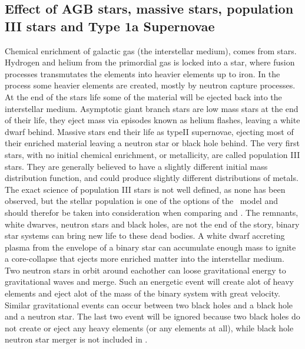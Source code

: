 \FloatBarrier
\subsection{Effect of AGB stars, massive stars, population III stars and Type 1a Supernovae}
\iffalse
set_star_plot_pop3_bound_iron.png
set_star_plot_pop3_bound_oxy.png
set_star_plot_pop3_yt_iron.png
set_star_plot_pop3_yt_oxy.png
set_star_plot_transmass.png
\fi
\iffalse
set_sn1a_plot_sn1a_dtd1_iron.png         
set_sn1a_plot_sn1a_dtd1_oxy.png          
set_sn1a_plot_sn1a_dtd2_iron.png         
set_sn1a_plot_sn1a_dtd2_oxy.png
set_sn1a_plot_sn1a_dtd3_iron.png
set_sn1a_plot_sn1a_dtd3_oxy.png
set_sn1a_plot_sn1a_num1_iron.png
set_sn1a_plot_sn1a_num1_oxy.png
set_sn1a_plot_sn1a_num2_iron.png
set_sn1a_plot_sn1a_num2_oxy.png
set_sn1a_plot_sn1a_yt.png
\fi


Chemical enrichment of galactic gas (the interstellar medium), comes from stars.
 Hydrogen and helium from the primordial gas is locked into a star, where fusion processes transmutates the elements into heavier elements up to iron. In the process some heavier elements are created, mostly by neutron capture processes. At the end of the stars life some of the material will be ejected back into the interstellar medium.
Asymptotic giant branch stars are low mass stars at the end of their life, they eject mass via episodes known as helium flashes, leaving a white dwarf behind.
Massive stars end their life as typeII supernovae, ejecting most of their enriched material leaving a neutron star or black hole behind.
The very first stars, with no initial chemical enrichment, or metallicity, are called population III stars. They are generally believed to have a slightly different initial mass distribution function, and could produce slightly different distributions of metals.
The exact science of population III stars is not well defined, as none has been observed, but the stellar population is one of the options of the \omegamodel\ model and should therefor be taken into consideration when comparing \eris and \omegamodel.
The remnants, white dwarves, neutron stars and black holes, are not the end of the story, binary star systems can bring new life to these dead bodies. A white dwarf accreting plasma from the envelope of a binary star can accumulate enough mass to ignite a core-collapse that ejects more enriched matter into the interstellar medium. Two neutron stars in orbit around eachother can loose gravitational energy to gravitational waves and merge. Such an energetic event will create alot of heavy elements and eject alot of the mass of the binary system with great velocity. Similar gravitational events can occur between two black holes and a black hole and a neutron star. The last two event will be ignored because two black holes do not create or eject any heavy elements (or any elements at all), while black hole neutron star merger is not included in \eris.

